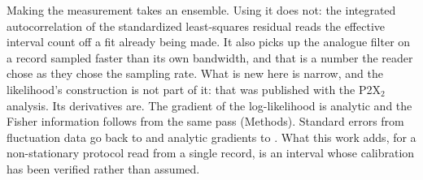 Making the measurement takes an ensemble. Using it does not: the integrated autocorrelation of the
standardized least-squares residual reads the effective interval count off a fit already being made.
It also picks up the analogue filter on a record sampled faster than its own bandwidth, and that is a
number the reader chose as they chose the sampling rate. What is new here is narrow, and the
likelihood's construction is not part of it: that was published with the P2X$_2$ analysis. Its
derivatives are. The gradient of the log-likelihood is analytic and the Fisher information follows
from the same pass (Methods). Standard errors from fluctuation data go back to
\citet{anderson1973voltage} and analytic gradients to \citet{milescu2005maximum}.
What this work adds, for a non-stationary protocol read from
a single record, is an interval whose calibration has been verified rather than assumed.
